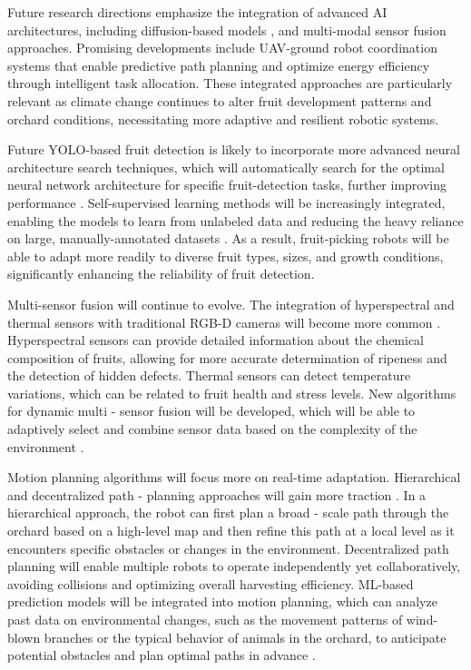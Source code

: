 \documentclass[a4paper,fleqn]{cas-dc}
\begin{document}
Future research directions emphasize the integration of advanced AI architectures, including diffusion-based models \cite{heschl2024synthset}, and multi-modal sensor fusion approaches. Promising developments include UAV-ground robot coordination systems that enable predictive path planning and optimize energy efficiency through intelligent task allocation. These integrated approaches are particularly relevant as climate change continues to alter fruit development patterns and orchard conditions, necessitating more adaptive and resilient robotic systems.

Future YOLO-based fruit detection is likely to incorporate more advanced neural architecture search techniques, which will automatically search for the optimal neural network architecture for specific fruit-detection tasks, further improving performance \cite{hou2023overview, suresh2023selective}. Self-supervised learning methods will be increasingly integrated, enabling the models to learn from unlabeled data and reducing the heavy reliance on large, manually-annotated datasets \cite{suresh2023selective, zhang2024automatic}. As a result, fruit-picking robots will be able to adapt more readily to diverse fruit types, sizes, and growth conditions, significantly enhancing the reliability of fruit detection.

Multi-sensor fusion will continue to evolve. The integration of hyperspectral and thermal sensors with traditional RGB-D cameras will become more common \cite{mohamed2021smart, martos2021ensuring}. Hyperspectral sensors can provide detailed information about the chemical composition of fruits, allowing for more accurate determination of ripeness and the detection of hidden defects. Thermal sensors can detect temperature variations, which can be related to fruit health and stress levels. New algorithms for dynamic multi - sensor fusion will be developed, which will be able to adaptively select and combine sensor data based on the complexity of the environment \cite{liu2024hierarchical}.

Motion planning algorithms will focus more on real-time adaptation. Hierarchical and decentralized path - planning approaches will gain more traction \cite{lytridis2021overview, li2023multi}. In a hierarchical approach, the robot can first plan a broad - scale path through the orchard based on a high-level map and then refine this path at a local level as it encounters specific obstacles or changes in the environment. Decentralized path planning will enable multiple robots to operate independently yet collaboratively, avoiding collisions and optimizing overall harvesting efficiency. ML-based prediction models will be integrated into motion planning, which can analyze past data on environmental changes, such as the movement patterns of wind-blown branches or the typical behavior of animals in the orchard, to anticipate potential obstacles and plan optimal paths in advance \cite{rajendran2024towards}.
\end{document}
